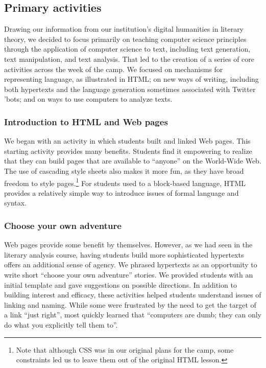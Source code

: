 \subsection{Primary activities}

Drawing our information from our institution's digital humanities in
literary theory, we decided to focus primarily on teaching computer
science principles through the application of computer science to text,
including text generation, text manipulation, and text analysis.  That
led to the creation of a series of core activities across the week of
the camp.  We focused on mechanisms for representing language,
as illustrated in HTML; on new ways of writing, including 
both hypertexts and the language generation sometimes associated
with Twitter 'bots; and on ways to use computers to analyze texts.

\subsubsection{Introduction to HTML and Web pages}

We began with an activity in which students built and linked Web
pages.  This starting activity provides many benefits.  Students find it
empowering to realize that they can build pages that are available
to ``anyone'' on the World-Wide Web.  The use of cascading style
sheets also makes it more fun, as they have broad freedom to style
pages.\footnote{Note that although CSS was in our original plans
for the camp, some constraints led us to leave them out of the
original HTML lesson.}  For students used to a block-based language,
HTML provides a relatively simple way to introduce issues of formal
language and syntax.

\subsubsection{Choose your own adventure}

Web pages provide some benefit by themselves.  However, as we had seen
in the literary analysis course, having students build more sophisticated
hypertexts offers an additional sense of agency.  We phrased hypertexts
as an opportunity to write short ``choose your own adventure'' stories.
We provided students with an initial template and gave suggestions on
possible directions.  In addition to building interest and efficacy, these
activities helped students understand issues of linking and naming.
While some were frustrated by the need to get the target of a link
``just right'', most quickly learned that ``computers are dumb; they
can only do what you explicitly tell them to''.

